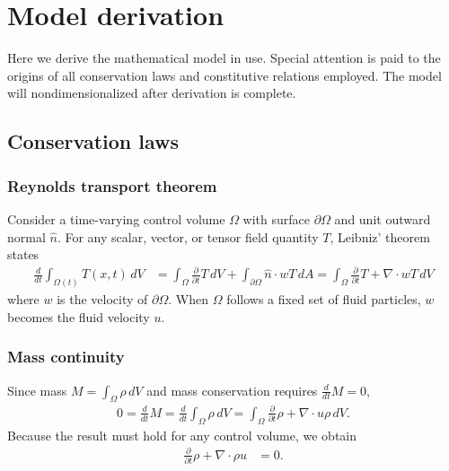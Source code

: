 \documentclass[letterpaper,11pt,nointlimits]{amsart}
\begin{document}
\section{Model derivation}

Here we derive the mathematical model in use.  Special attention is
paid to the origins of all conservation laws and constitutive relations
employed.  The model will nondimensionalized after derivation is complete.

\subsection{Conservation laws}

\subsubsection{Reynolds transport theorem}

Consider a time-varying control volume $\Omega$ with surface
$\partial\Omega$ and unit outward normal $\hat{n}$.  For any 
scalar, vector, or tensor field quantity
$T$, Leibniz' theorem states
\begin{align}
  \label{eq:rtt}
  \frac{d}{dt}\int_{\Omega(t)}T(x,t)\,dV
  &=
  \int_{\Omega}\frac{\partial}{\partial{}t}T\,dV
  +
  \int_{\partial\Omega} \hat{n}\cdot{}w T\,dA
  =
  \int_{\Omega}\frac{\partial}{\partial{}t}T+\nabla\cdot{}wT\,dV
\end{align}
where $w$ is the velocity of $\partial\Omega$.  When $\Omega$ follows
a fixed set of fluid particles, $w$ becomes the fluid velocity $u$.

\subsubsection{Mass continuity} 
Since mass $M=\int_{\Omega} \rho\,dV$
and mass conservation requires $\frac{d}{dt}M=0$,
\begin{align}
  0 = \frac{d}{dt}M 
  = \frac{d}{dt}\int_{\Omega} \rho\,dV
  =
  \int_{\Omega}\frac{\partial}{\partial{}t}\rho+\nabla\cdot{}u\rho{}\,dV.
\end{align}
Because the result must hold for any control volume, we obtain
\begin{align}
  \label{eq:cons_mass}
  \frac{\partial}{\partial{}t}\rho+\nabla\cdot\rho{}u &= 0
  .
\end{align}
\end{document}
